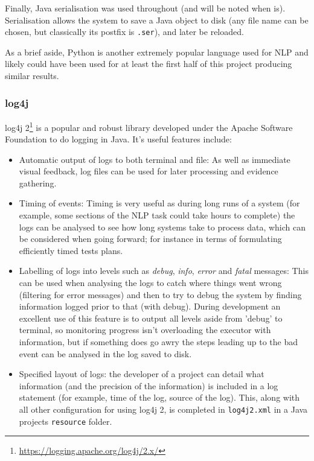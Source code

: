 Finally, Java serialisation was used throughout (and will be noted when is). Serialisation allows the system to save a Java object to disk (any file name can be chosen, but classically its postfix is \texttt{.ser}), and later be reloaded. 

As a brief aside, Python is another extremely popular language used for NLP and likely could have been used for at least the first half of this project producing similar results.

\subsubsection*{log4j}
log4j 2\footnote{\href{https://logging.apache.org/log4j/2.x/}{https://logging.apache.org/log4j/2.x/}} is a popular and robust library developed under the Apache Software Foundation to do logging in Java. It's useful features include:
\begin{itemize}
	\item Automatic output of logs to both terminal and file: As well as immediate visual feedback, log files can be used for later processing and evidence gathering.
	\item Timing of events: Timing is very useful as during long runs of a system (for example, some sections of the NLP task could take hours to complete) the logs can be analysed to see how long systems take to process data, which can be considered when going forward; for instance in terms of formulating efficiently timed tests plans.
	\item Labelling of logs into levels such as \textit{debug}, \textit{info}, \textit{error} and \textit{fatal} messages: This can be used when analysing the logs to catch where things went wrong (filtering for error messages) and then to try to debug the system by finding information logged prior to that (with debug). During development an excellent use of this feature is to output all levels aside from 'debug' to terminal, so monitoring progress isn't overloading the executor with information, but if something does go awry the steps leading up to the bad event can be analysed in the log saved to disk.
	\item Specified layout of logs: the developer of a project can detail what information (and the precision of the information) is included in a log statement (for example, time of the log, source of the log). This, along with all other configuration for using log4j 2, is completed in \texttt{log4j2.xml} in a Java projects \texttt{resource} folder.
\end{itemize}

